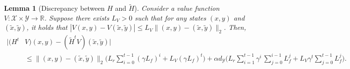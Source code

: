 \documentclass[11pt, notitlepage]{article}
\newcommand{\1}{\mathbbm{1}}
\newtheorem{lemma}{Lemma}[section]
\begin{document}
\begin{lemma}[Discrepancy between $H$ and $\tilde{H}$]
    \label{lemma:HV_H'V}
    Consider a value function $V:\mathcal X \times \mathcal Y \rightarrow \mathbb R$. Suppose there exists $L_V>0$ such that for any states $(x,y)$ and $(\tilde{x},\tilde{y})$, it holds that $
    |V(x,y) - V(\tilde{x},\tilde{y})| \leq L_V \|(x,y) - (\tilde{x},\tilde{y})\|_2$.
    Then,
    \begin{align*}
       \bigl | (H^t &V)(x,y) - (\tilde{H}^t V) (\tilde{x},\tilde{y}) \bigr | \\
       &\leq \bigl\|(x,y)-(\tilde{x}, \tilde{y}) \bigl\|_2 \biggl(L_r \sum_{i=0}^{t-1} (\gamma L_f)^i + L_V (\gamma L_f)^t\biggr) + \alpha d_\mathcal{Y} \biggl( L_r \sum_{i=1}^{t-1} \gamma^i \, \sum_{j=0}^{i-1} L_f^j  + L_V \gamma^t \sum_{j=0}^{t-1} L_f^j \biggr).
    \end{align*}
\end{lemma}
\end{document}
